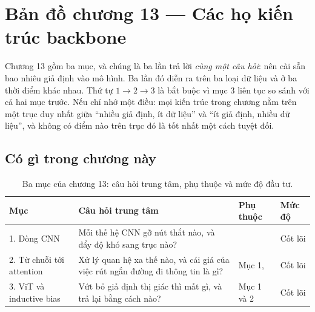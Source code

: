 \documentclass[../../deep_learning.tex]{subfiles}
\begin{document}
\section*{Bản đồ chương 13 --- Các họ kiến trúc backbone}

\begin{tomtat}
Chương 13 gồm ba mục, và chúng là ba lần trả lời \emph{cùng một câu hỏi}: nên cài sẵn bao nhiêu giả định vào mô hình. Ba lần đó diễn ra trên ba loại dữ liệu và ở ba thời điểm khác nhau. Thứ tự \(1 \rightarrow 2 \rightarrow 3\) là bắt buộc vì mục 3 liên tục so sánh với cả hai mục trước. Nếu chỉ nhớ một điều: mọi kiến trúc trong chương nằm trên một trục duy nhất giữa ``nhiều giả định, ít dữ liệu'' và ``ít giả định, nhiều dữ liệu'', và không có điểm nào trên trục đó là tốt nhất một cách tuyệt đối.
\end{tomtat}

\begin{nentang}
\end{nentang}

\subsection*{Có gì trong chương này}

\begin{table}[H]\centering\small
\caption{Ba mục của chương 13: câu hỏi trung tâm, phụ thuộc và mức độ đầu tư.}
\label{tab:map-ch13}
\begin{tabularx}{\linewidth}{@{}L{3.4cm}YL{2.4cm}L{1.9cm}@{}}
\toprule
\textbf{Mục} & \textbf{Câu hỏi trung tâm} & \textbf{Phụ thuộc} & \textbf{Mức độ}\\
. Dòng CNN & Mỗi thế hệ CNN gỡ nút thắt nào, và đẩy độ khó sang trục nào? &  & Cốt lõi \\
2. Từ chuỗi tới attention & Xử lý quan hệ xa thế nào, và cái giá của việc rút ngắn đường đi thông tin là gì? & Mục 1,  & Cốt lõi \\
3. ViT và inductive bias & Vứt bỏ giả định thị giác thì mất gì, và trả lại bằng cách nào? & Mục 1 và 2 & Cốt lõi \\
\bottomrule
\end{tabularx}
\end{table}
\end{document}
